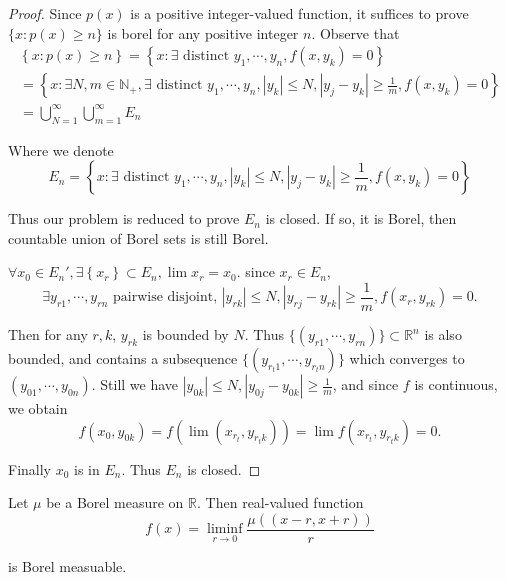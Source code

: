 \begin{proof}
	Since $ p(x) $ is a positive integer-valued function, it suffices to prove $ \{x:p(x)\ge n\} $ is borel for any positive integer $ n $. Observe that
	\begin{gather*}
		\left\{ x:p( x ) \ge n \right\} =\left\{ x:\exists \text{ distinct }y_1,\cdots ,y_n, f( x,y_k ) =0 \right\} \\
		=\left\{ x:\exists N,m\in \mathbb{N}_+,\exists \text{ distinct }y_1,\cdots ,y_n, |y_k|\le N,|y_j-y_k|\ge \frac{1}{m},f( x,y_k ) =0 \right\} \\
		=\bigcup_{N=1}^{\infty}{\bigcup_{m=1}^{\infty}{E_n}}
	\end{gather*}

	Where we denote
	$$
		E_n=\left\{ x:\exists \text{ distinct }y_1,\cdots ,y_n, |y_k|\le N,|y_j-y_k|\ge \frac{1}{m},f( x,y_k ) =0 \right\}
	$$

	Thus our problem is reduced to prove $ E_{n} $ is closed. If so, it is Borel, then countable union of Borel sets is still Borel.

	$
		\forall x_0\in E_n',\exists \left\{ x_r \right\} \subset E_n,\lim x_r=x_0
	$. since $ x_r\in E_n $,
	$$
		\exists y_{r1},\cdots ,y_{rn}\text{ pairwise disjoint, }|y_{rk}|\le N,|y_{rj}-y_{rk}|\ge \frac{1}{m},f( x_r,y_{rk} ) =0.
	$$

	Then for any $ r,k $, $ y_{rk} $ is bounded by $ N $. Thus $
		\{( y_{r1},\cdots ,y_{rn} )\} \subset \mathbb{R}^n
	$ is also bounded, and contains a subsequence $
		\{ ( y_{r_t1},\cdots ,y_{r_tn} ) \}
	$ which converges to $
		( y_{01},\cdots ,y_{0n} )
	$. Still we have $
		|y_{0k}|\le N,|y_{0j}-y_{0k}|\ge \frac{1}{m}
	$, and since $ f $ is continuous, we obtain
	$$
		f( x_0,y_{0k} ) =f( \lim \left( x_{r_t},y_{r_tk} \right) ) =\lim f( x_{r_t},y_{r_tk} ) =0.
	$$

	Finally $ x_{0} $ is in $ E_{n} $. Thus $ E_{n} $ is closed.
\end{proof}

\begin{problem}
Let $ \mu $ be a Borel measure on $ \mathbb{R}  $. Then real-valued function
\[
	f(x)=\liminf_{r\to 0}\frac{\mu((x-r,x+r))}{r}
\]

is Borel measuable.
\end{problem}

